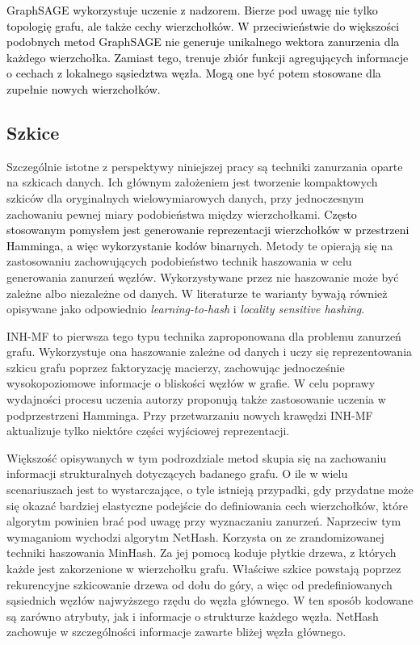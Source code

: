         \textcolor{black}{
        GraphSAGE\cite{DBLP:journals/corr/HamiltonYL17} wykorzystuje uczenie z nadzorem. Bierze pod uwagę nie tylko topologię grafu, ale także cechy wierzchołków. W przeciwieństwie do większości podobnych metod GraphSAGE nie generuje unikalnego wektora zanurzenia dla każdego wierzchołka. Zamiast tego, trenuje zbiór funkcji agregujących informacje o cechach z lokalnego sąsiedztwa węzła. Mogą one być potem stosowane dla zupełnie nowych wierzchołków.}
        
    \subsection{Szkice}
        Szczególnie istotne z perspektywy niniejszej pracy są techniki zanurzania oparte na szkicach danych. Ich głównym założeniem jest tworzenie kompaktowych szkiców dla oryginalnych wielowymiarowych danych, przy jednoczesnym zachowaniu pewnej miary podobieństwa między wierzchołkami. \textcolor{black}{Często stosowanym pomysłem jest generowanie reprezentacji wierzchołków w przestrzeni Hamminga\cite{Hamming_1950}, a więc wykorzystanie kodów binarnych}. Metody te opierają się na zastosowaniu zachowujących podobieństwo technik haszowania w celu generowania zanurzeń węzłów. Wykorzystywane przez nie haszowanie może być zależne albo niezależne od danych. W literaturze te warianty bywają również opisywane jako odpowiednio \textit{learning-to-hash} i \textit{locality sensitive hashing}\cite{wang2017survey}.  

        INH-MF\cite{Lian_Zheng_Zheng_Ge_Cao_Tsang_Xie_2018} to pierwsza tego typu technika zaproponowana dla problemu zanurzeń grafu. Wykorzystuje ona haszowanie zależne od danych i uczy się reprezentowania szkicu grafu poprzez faktoryzację macierzy, zachowując jednocześnie wysokopoziomowe informacje o bliskości węzłów w grafie. W celu poprawy wydajności procesu uczenia autorzy proponują także zastosowanie uczenia w podprzestrzeni Hamminga. Przy przetwarzaniu nowych krawędzi INH-MF aktualizuje tylko niektóre części wyjściowej reprezentacji.
        
        Większość opisywanych w tym podrozdziale metod skupia się na zachowaniu informacji strukturalnych dotyczących badanego grafu. O ile w wielu scenariuszach jest to wystarczające, o tyle istnieją przypadki, gdy przydatne może się okazać bardziej elastyczne podejście do definiowania cech wierzchołków, które algorytm powinien brać pod uwagę przy wyznaczaniu zanurzeń. Naprzeciw tym wymaganiom wychodzi algorytm NetHash\cite{Wu_Li_Chen_Zhang_2018}. Korzysta on ze zrandomizowanej techniki haszowania MinHash. Za jej pomocą koduje płytkie drzewa, z których każde jest zakorzenione w wierzchołku grafu. Właściwe szkice powstają poprzez rekurencyjne szkicowanie drzewa od dołu do góry, a więc od predefiniowanych sąsiednich węzłów najwyższego rzędu do węzła głównego. W ten sposób kodowane są zarówno atrybuty, jak i informacje o strukturze każdego węzła. NetHash zachowuje w szczególności  informacje zawarte bliżej węzła głównego.
        
